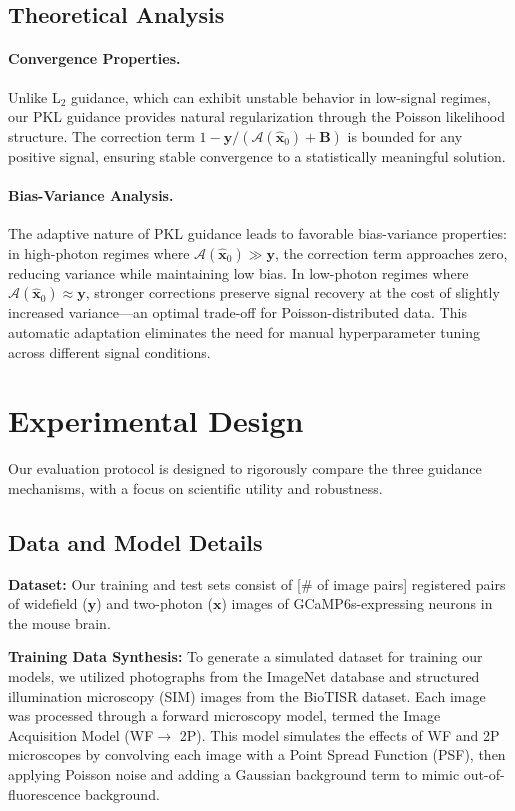 \documentclass{article}
\newcommand{\wf}{WF\xspace}
\newcommand{\twop}{2P\xspace}
\begin{document}
\subsection{Theoretical Analysis}

\paragraph{Convergence Properties.} Unlike L$_2$ guidance, which can exhibit unstable behavior in low-signal regimes, our PKL guidance provides natural regularization through the Poisson likelihood structure. The correction term $1 - \mathbf{y}/(\mathcal{A}(\mathbf{\hat{x}}_0) + \mathbf{B})$ is bounded for any positive signal, ensuring stable convergence to a statistically meaningful solution.

\paragraph{Bias-Variance Analysis.} The adaptive nature of PKL guidance leads to favorable bias-variance properties: in high-photon regimes where $\mathcal{A}(\mathbf{\hat{x}}_0) \gg \mathbf{y}$, the correction term approaches zero, reducing variance while maintaining low bias. In low-photon regimes where $\mathcal{A}(\mathbf{\hat{x}}_0) \approx \mathbf{y}$, stronger corrections preserve signal recovery at the cost of slightly increased variance—an optimal trade-off for Poisson-distributed data. This automatic adaptation eliminates the need for manual hyperparameter tuning across different signal conditions.

\section{Experimental Design}
\label{sec:experiments}
Our evaluation protocol is designed to rigorously compare the three guidance mechanisms, with a focus on scientific utility and robustness.

\subsection{Data and Model Details}
\textbf{Dataset:} Our training and test sets consist of [{\# of image pairs}] registered pairs of widefield ($\mathbf{y}$) and two-photon ($\mathbf{x}$) images of GCaMP6s-expressing neurons in the mouse brain.

\textbf{Training Data Synthesis:} To generate a simulated dataset for training our models, we utilized photographs from the ImageNet database and structured illumination microscopy (SIM) images from the BioTISR dataset. Each image was processed through a forward microscopy model, termed the Image Acquisition Model (\wf $\rightarrow$ \twop). This model simulates the effects of \wf and \twop microscopes by convolving each image with a Point Spread Function (PSF), then applying Poisson noise and adding a Gaussian background term to mimic out-of-fluorescence background.
\end{document}
